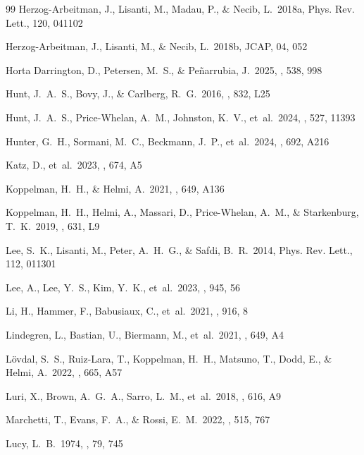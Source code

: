 \documentclass{aa}  %
\begin{document}
\begin{thebibliography}{99}
Herzog-Arbeitman, J., Lisanti, M., Madau, P., \& Necib, L.\ 2018a,
Phys. Rev. Lett., 120, 041102

Herzog-Arbeitman, J., Lisanti, M., \& Necib, L.\ 2018b, JCAP, 04, 052

Horta Darrington, D., Petersen, M.~S., \& Pe\~narrubia, J.\ 2025,
\mnras, 538, 998

Hunt, J.~A.~S., Bovy, J., \& Carlberg, R.~G.\ 2016,
\apjl, 832, L25

Hunt, J.~A.~S., Price-Whelan, A.~M., Johnston, K.~V., et~al.\ 2024,
\mnras, 527, 11393

Hunter, G.~H., Sormani, M.~C., Beckmann, J.~P., et~al.\ 2024,
\aap, 692, A216

Katz, D., et~al.\ 2023, \aap, 674, A5

Koppelman, H.~H., \& Helmi, A.\ 2021, \aap, 649, A136

Koppelman, H.~H., Helmi, A., Massari, D., Price-Whelan, A.~M., \&
Starkenburg, T.~K.\ 2019, \aap, 631, L9

Lee, S.~K., Lisanti, M., Peter, A.~H.~G., \& Safdi, B.~R.\ 2014,
Phys. Rev. Lett., 112, 011301

Lee, A., Lee, Y.~S., Kim, Y.~K., et~al.\ 2023, \apj, 945, 56

Li, H., Hammer, F., Babusiaux, C., et~al.\ 2021, \apj, 916, 8

Lindegren, L., Bastian, U., Biermann, M., et~al.\ 2021, \aap, 649, A4

L\"ovdal, S.~S., Ruiz-Lara, T., Koppelman, H.~H., Matsuno, T., Dodd,
E., \& Helmi, A.\ 2022, \aap, 665, A57

Luri, X., Brown, A.~G.~A., Sarro, L.~M., et~al.\ 2018, \aap, 616, A9

Marchetti, T., Evans, F.~A., \& Rossi, E.~M.\ 2022, \mnras, 515, 767

Lucy, L.~B.\ 1974, \aj, 79, 745


\end{thebibliography}
\end{document}
